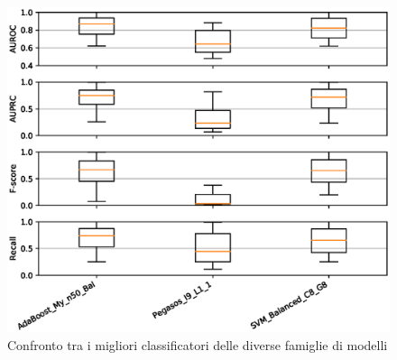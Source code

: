 \vspace*{\fill}



\vspace*{\fill}

\begin{figure}[ht]%
    \centering
    \includegraphics[scale = 0.80]{CC-level3}%
    \caption{Confronto tra i migliori classificatori delle diverse famiglie di modelli}%
    \label{fig:liv3} 
\end{figure}

\vspace*{\fill}


\vspace*{\fill}

